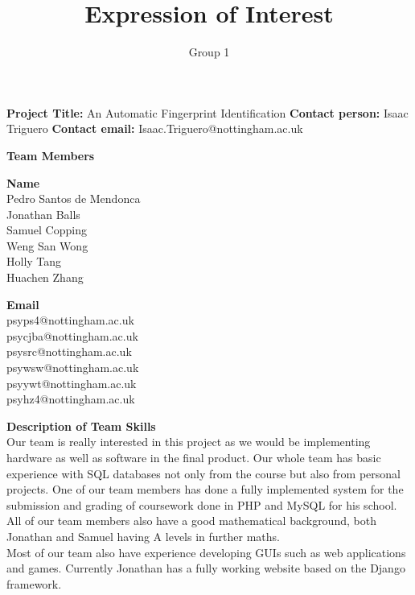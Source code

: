 \documentclass[11pt, oneside]{article}
\title{Expression of Interest}
\author{Group 1}
\begin{document}
\maketitle
\textbf{Project Title: }An Automatic Fingerprint Identification\newline
\textbf{Contact person: }Isaac Triguero\newline
\textbf{Contact email: }Isaac.Triguero@nottingham.ac.uk\newline
    
\vspace{0.3cm}
\textbf{Team Members}\newline
\begin{minipage}[t]{0.5\textwidth}
    \textbf{Name}\\
    Pedro Santos de Mendonca\\
    Jonathan Balls\\
    Samuel Copping\\
    Weng San Wong\\
    Holly Tang\\
    Huachen Zhang\\
\end{minipage}
\begin{minipage}[t]{0.5\textwidth}
    \textbf{Email}\\
    psyps4@nottingham.ac.uk \\
    psycjba@nottingham.ac.uk \\
    psysrc@nottingham.ac.uk \\
    psywsw@nottingham.ac.uk \\
    psyywt@nottingham.ac.uk \\
    psyhz4@nottingham.ac.uk \\
\end{minipage}
\textbf{Description of Team Skills}\\
Our team is really interested in this project as we would be implementing hardware as well as software in the final product. Our whole team has basic experience with SQL databases not only from the course but also from personal projects. One of our team members has done a fully implemented system for the submission and grading of coursework done in PHP and MySQL for his school.\\
All of our team members also have a good mathematical background, both Jonathan and Samuel having A levels in further maths.\\
Most of our team also have experience developing GUIs such as web applications and games. Currently Jonathan has a fully working website based on the Django framework. 
\end{document}
